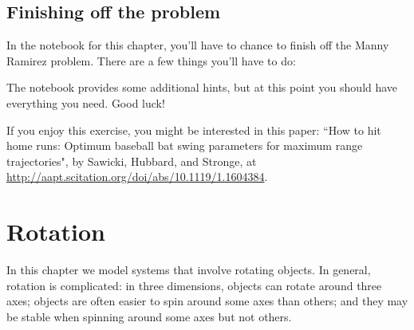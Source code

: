 \documentclass[12pt]{book}
\theoremstyle{exercise}
\newcommand{\py}{\verb}%}
\begin{document}
\section{Finishing off the problem}

In the notebook for this chapter, you'll have to chance to finish off the Manny Ramirez problem.  There are a few things you'll have to do:


The notebook provides some additional hints, but at this point you should have everything you need.  Good luck!

If you enjoy this exercise, you might be interested in this paper: ``How to hit home runs: Optimum baseball bat swing parameters for maximum range trajectories", by Sawicki, Hubbard, and Stronge, at \url{http://aapt.scitation.org/doi/abs/10.1119/1.1604384}.


\chapter{Rotation}

In this chapter we model systems that involve rotating objects.  In general, rotation is complicated:  in three dimensions, objects can rotate around three axes; objects are often easier to spin around some axes than others; and they may be stable when spinning around some axes but not others.  
\end{document}
